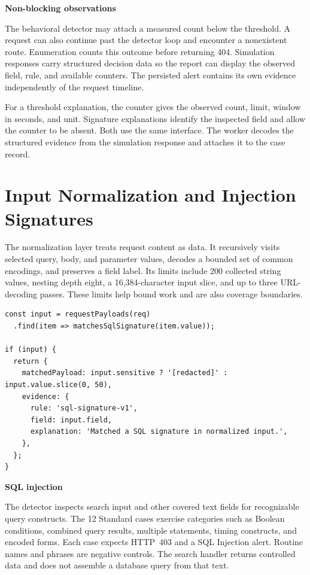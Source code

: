 \documentclass[11pt,a4paper,oneside]{report}
\newcommand{\topic}[1]{\smallskip\noindent\textbf{#1}\par\nobreak\vspace{-.39em}}
\newcommand{\sheet}[1]{\clearpage\section{#1}}
\begin{document}
\topic{Non-blocking observations}
The behavioral detector may attach a measured count below the threshold. A request can also continue past the detector loop and encounter a nonexistent route. Enumeration counts this outcome before returning 404. Simulation responses carry structured decision data so the report can display the observed field, rule, and available counters. The persisted alert contains its own evidence independently of the request timeline.



For a threshold explanation, the counter gives the observed count, limit, window in seconds, and unit. Signature explanations identify the inspected field and allow the counter to be absent. Both use the same interface. The worker decodes the structured evidence from the simulation response and attaches it to the case record.

\sheet{Input Normalization and Injection Signatures}
The normalization layer treats request content as data. It recursively visits selected query, body, and parameter values, decodes a bounded set of common encodings, and preserves a field label. Its limits include 200 collected string values, nesting depth eight, a 16,384-character input slice, and up to three URL-decoding passes. These limits help bound work and are also coverage boundaries.

\begin{lstlisting}[caption={Adapted evidence construction from server/detectors/sqli.ts}]
const input = requestPayloads(req)
  .find(item => matchesSqlSignature(item.value));

if (input) {
  return {
    matchedPayload: input.sensitive ? '[redacted]' : input.value.slice(0, 50),
    evidence: {
      rule: 'sql-signature-v1',
      field: input.field,
      explanation: 'Matched a SQL signature in normalized input.',
    },
  };
}
\end{lstlisting}

\topic{SQL injection}
The detector inspects search input and other covered text fields for recognizable query constructs. The 12 Standard cases exercise categories such as Boolean conditions, combined query results, multiple statements, timing constructs, and encoded forms. Each case expects HTTP~403 and a SQL Injection alert. Routine names and phrases are negative controls. The search handler returns controlled data and does not assemble a database query from that text.
\end{document}
